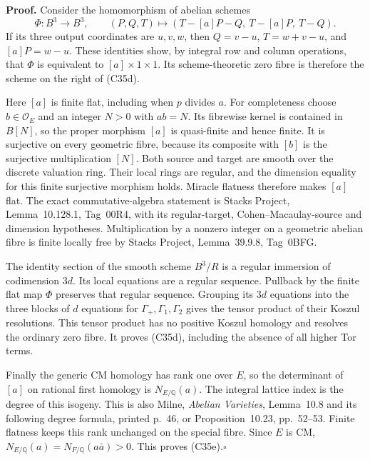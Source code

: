 \documentclass[11pt]{article}
\newcommand{\Q}{\mathbb Q}\newcommand{\C}{\mathbb C}\newcommand{\Z}{\mathbb Z}\newcommand{\R}{\mathbb R}\newcommand{\A}{\mathbb A}\newcommand{\OO}{\mathcal O}
\theoremstyle{definition}\newtheorem{definition}[theorem]{Definition}\newtheorem{remark}[theorem]{Remark}
\begin{document}
\textbf{Proof.}
Consider the homomorphism of abelian schemes
\[
 \Phi:B^3\longrightarrow B^3,\qquad
 (P,Q,T)\longmapsto
       (T-[a]P-Q,\ T-[a]P,\ T-Q).
 \tag{C35f}
\]
If its three output coordinates are $u,v,w$, then
$Q=v-u$, $T=w+v-u$, and $[a]P=w-u$.
These identities show, by integral row and column operations,
that $\Phi$ is equivalent to $[a]\times1\times1$.
Its scheme-theoretic zero fibre is therefore the scheme on
the right of (C35d).

Here $[a]$ is finite flat, including when $p$ divides $a$.
For completeness choose $b\in\mathcal O_E$ and an integer
$N>0$ with $ab=N$. Its fibrewise kernel is contained in
$B[N]$, so the proper morphism $[a]$ is quasi-finite and
hence finite. It is surjective on every geometric fibre,
because its composite with $[b]$ is the surjective
multiplication $[N]$. Both source and target are smooth
over the discrete valuation ring. Their local rings are
regular, and the dimension equality for this finite
surjective morphism holds. Miracle flatness therefore
makes $[a]$ flat. The exact commutative-algebra statement
is Stacks Project, Lemma~10.128.1, Tag~00R4, with its
regular-target, Cohen--Macaulay-source and dimension
hypotheses. Multiplication by a nonzero integer on a
geometric abelian fibre is finite locally free by
Stacks Project, Lemma~39.9.8, Tag~0BFG.

The identity section of the smooth scheme $B^3/R$ is a
regular immersion of codimension $3d$. Its local equations
are a regular sequence. Pullback by the finite flat map
$\Phi$ preserves that regular sequence. Grouping its
$3d$ equations into the three blocks of $d$ equations
for $\Gamma_+,\Gamma_1,\Gamma_2$ gives the tensor product
of their Koszul resolutions. This tensor product has no
positive Koszul homology and resolves the ordinary zero
fibre. It proves (C35d), including the absence of all
higher Tor terms.

Finally the generic CM homology has rank one over $E$,
so the determinant of $[a]$ on rational first homology is
$N_{E/\Q}(a)$. The integral lattice index is the degree
of this isogeny. This is also Milne, \emph{Abelian
Varieties}, Lemma~10.8 and its following degree formula,
printed p.~46, or Proposition~10.23, pp.~52--53.
Finite flatness keeps this rank unchanged on the special
fibre. Since $E$ is CM, $N_{E/\Q}(a)=N_{F/\Q}(a\bar a)>0$.
This proves (C35e).\hfill$\square$
\end{document}
